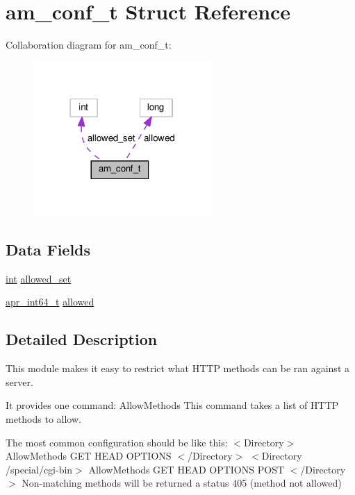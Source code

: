 \hypertarget{structam__conf__t}{}\section{am\+\_\+conf\+\_\+t Struct Reference}
\label{structam__conf__t}


Collaboration diagram for am\+\_\+conf\+\_\+t\+:
\nopagebreak
\begin{figure}[H]
\begin{center}
\leavevmode
\includegraphics[width=194pt]{structam__conf__t__coll__graph}
\end{center}
\end{figure}
\subsection*{Data Fields}
\begin{DoxyCompactItemize}
\item 
\hyperlink{pcre_8txt_a42dfa4ff673c82d8efe7144098fbc198}{int} \hyperlink{structam__conf__t_a7061dd091ec75bdb12cb8eaa1ecdb812}{allowed\+\_\+set}
\item 
\hyperlink{group__apr__platform_ga4b75afbf973dc6c8aea4ae75b044aa08}{apr\+\_\+int64\+\_\+t} \hyperlink{structam__conf__t_abb389a7ad017b8d2a3f897ae911e02e5}{allowed}
\end{DoxyCompactItemize}


\subsection{Detailed Description}
This module makes it easy to restrict what H\+T\+TP methods can be ran against a server.

It provides one command\+: Allow\+Methods This command takes a list of H\+T\+TP methods to allow.

The most common configuration should be like this\+: $<$\+Directory$>$ Allow\+Methods G\+ET H\+E\+AD O\+P\+T\+I\+O\+NS $<$/\+Directory$>$ $<$Directory /special/cgi-\/bin$>$ Allow\+Methods G\+ET H\+E\+AD O\+P\+T\+I\+O\+NS P\+O\+ST $<$/\+Directory$>$ Non-\/matching methods will be returned a status 405 (method not allowed)

